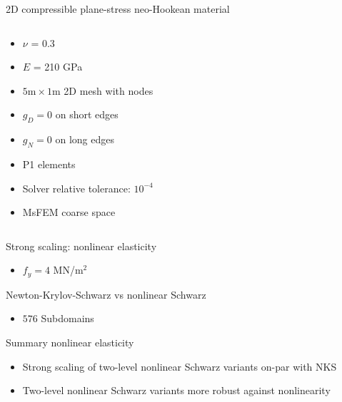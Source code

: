 \begin{frame}{2D compressible plane-stress neo-Hookean material}
\begin{columns}
\begin{column}{0.6\textwidth}
\begin{itemize}
				\item $\nu$ = 0.3
				\item $E$ = 210 GPa
				\item $5\textrm{m}\times 1\textrm{m}$ 2D mesh with  nodes
        \item $g_D = 0$ on short edges
				\item $g_N = 0$ on long edges
				\item P1 elements
        \item Solver relative tolerance: $10^{-4}$
        \item MsFEM coarse space \footnotemark{}
			\end{itemize}
		\end{column}
	\end{columns}
\end{frame}

\begin{frame}{Strong scaling: nonlinear elasticity}
	\begin{itemize}
		\item $f_y = 4$ MN/m$^{2}$
	\end{itemize}
	\begin{figure}
		\centering
		
		\label{fig:strong-scalability-elascticity}
	\end{figure}
\end{frame}

\begin{frame}{Newton-Krylov-Schwarz vs nonlinear Schwarz}
	\begin{itemize}
		\item $576$ Subdomains
	\end{itemize}
	\begin{figure}
		\centering
		
		\label{fig:nks-vs-nls}
	\end{figure}
\end{frame}

 \begin{frame}{Summary nonlinear elasticity}
   \begin{itemize}
     \item Strong scaling of two-level nonlinear Schwarz variants on-par with NKS
     \item Two-level nonlinear Schwarz variants more robust against nonlinearity
   \end{itemize}
 \end{frame}
